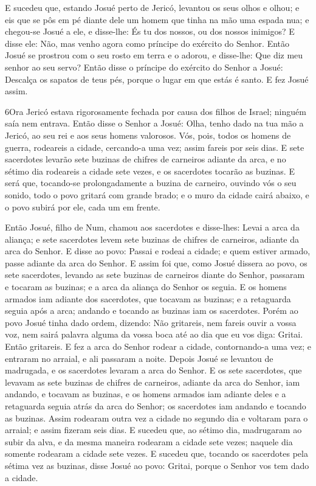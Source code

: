 E sucedeu que, estando Josué perto de Jericó, levantou os seus
olhos e olhou; e eis que se pôs em pé diante dele um homem que tinha
na mão uma espada nua; e chegou-se Josué a ele, e disse-lhe: És tu
dos nossos, ou dos nossos inimigos? E disse ele: Não, mas
venho agora como príncipe do exército do Senhor. Então Josué se
prostrou com o seu rosto em terra e o adorou, e disse-lhe: Que diz
meu senhor ao seu servo? Então disse o príncipe do exército
do Senhor a Josué: Descalça os sapatos de teus pés, porque o lugar
em que estás é santo. E fez Josué assim.

\medskip

\lettrine{6} Ora Jericó estava rigorosamente fechada por causa
dos filhos de Israel; ninguém saía nem entrava. Então disse o
Senhor a Josué: Olha, tenho dado na tua mão a Jericó, ao seu rei e
aos seus homens valorosos. Vós, pois, todos os homens de guerra,
rodeareis a cidade, cercando-a uma vez; assim fareis por seis dias.
E sete sacerdotes levarão sete buzinas de chifres de carneiros
adiante da arca, e no sétimo dia rodeareis a cidade sete vezes, e os
sacerdotes tocarão as buzinas. E será que, tocando-se
prolongadamente a buzina de carneiro, ouvindo vós o seu sonido, todo
o povo gritará com grande brado; e o muro da cidade cairá abaixo, e
o povo subirá por ele, cada um em frente.

Então Josué, filho de Num, chamou aos sacerdotes e disse-lhes:
Levai a arca da aliança; e sete sacerdotes levem sete buzinas de
chifres de carneiros, adiante da arca do Senhor. E disse ao
povo: Passai e rodeai a cidade; e quem estiver armado, passe adiante
da arca do Senhor. E assim foi que, como Josué dissera ao povo,
os sete sacerdotes, levando as sete buzinas de carneiros diante do
Senhor, passaram e tocaram as buzinas; e a arca da aliança do Senhor
os seguia. E os homens armados iam adiante dos sacerdotes, que
tocavam as buzinas; e a retaguarda seguia após a arca; andando e
tocando as buzinas iam os sacerdotes. Porém ao povo Josué
tinha dado ordem, dizendo: Não gritareis, nem fareis ouvir a vossa
voz, nem sairá palavra alguma da vossa boca até ao dia que eu vos
diga: Gritai. Então gritareis. E fez a arca do Senhor rodear
a cidade, contornando-a uma vez; e entraram no arraial, e ali
passaram a noite. Depois Josué se levantou de madrugada, e os
sacerdotes levaram a arca do Senhor. E os sete sacerdotes,
que levavam as sete buzinas de chifres de carneiros, adiante da arca
do Senhor, iam andando, e tocavam as buzinas, e os homens armados
iam adiante deles e a retaguarda seguia atrás da arca do Senhor; os
sacerdotes iam andando e tocando as buzinas. Assim rodearam
outra vez a cidade no segundo dia e voltaram para o arraial; e assim
fizeram seis dias. E sucedeu que, ao sétimo dia, madrugaram
ao subir da alva, e da mesma maneira rodearam a cidade sete vezes;
naquele dia somente rodearam a cidade sete vezes. E sucedeu
que, tocando os sacerdotes pela sétima vez as buzinas, disse Josué
ao povo: Gritai, porque o Senhor vos tem dado a cidade.

